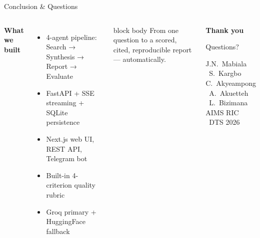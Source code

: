 \documentclass[aspectratio=169, 10pt]{beamer}
\newenvironment{hlbox}{%
  \begin{beamercolorbox}[rounded=true, sep=4pt, wd=\linewidth]{block body}%
    \small}{%
  \end{beamercolorbox}}
\begin{document}
\begin{frame}{Conclusion \& Questions}
  \begin{columns}[T]
      \textbf{\color{aims-blue}What we built}
      \begin{itemize}
        \item 4-agent pipeline: Search → Synthesis → Report → Evaluate
        \item FastAPI + SSE streaming + SQLite persistence
        \item Next.js web UI, REST API, Telegram bot
        \item Built-in 4-criterion quality rubric
        \item Groq primary + HuggingFace fallback
      \end{itemize}
      \vspace{0.4em}
      \begin{hlbox}
        \scriptsize From one question to a scored, cited, reproducible report
        --- automatically.
      \end{hlbox}
      \begin{center}
        \vfill
        {\Large\bfseries\color{aims-blue}Thank you}\par
        \vspace{0.5em}
        {\normalsize\color{aims-teal}Questions?}\par
        \vspace{0.6em}
        \par
        \vspace{0.6em}
        {\small\color{black!55}
          J.N.\ Mabiala \textbullet\ S.\ Kargbo\\
          C.\ Akyeampong \textbullet\ A.\ Akuetteh \textbullet\ L.\ Bizimana\\[0.3em]
          AIMS RIC \textbullet\ DTS 2026%
        }
        \vfill
      \end{center}
  \end{columns}
\end{frame}
\end{document}
